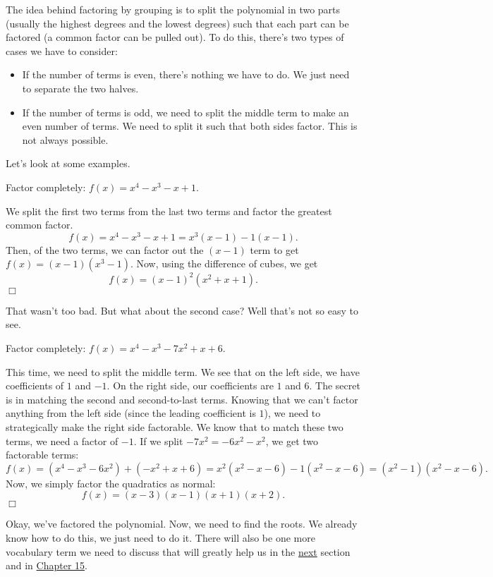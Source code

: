 \documentclass[../book.tex]{subfiles}
\begin{document}
The idea behind factoring by grouping is to split the polynomial in two parts (usually the highest degrees and the lowest degrees) such that each part can be factored (a common factor can be pulled out).  To do this, there's two types of cases we have to consider: \begin{itemize}
    \item If the number of terms is even, there's nothing we have to do.  We just need to separate the two halves.
    \item If the number of terms is odd, we need to split the middle term to make an even number of terms.  We need to split it such that both sides factor.  This is not always possible.
\end{itemize}
Let's look at some examples.
\begin{example}
Factor completely: $f(x)=x^4-x^3-x+1.$
\end{example}
\begin{solution}
We split the first two terms from the last two terms and factor the greatest common factor. $$f(x)=x^4-x^3-x+1=x^3(x-1)-1(x-1).$$ Then, of the two terms, we can factor out the $(x-1)$ term to get $f(x)=(x-1)(x^3-1).$ Now, using the difference of cubes, we get $$f(x)=(x-1)^2(x^2+x+1).$$ $\Box$
\end{solution}
That wasn't too bad.  But what about the second case? Well that's not so easy to see.
\begin{example}
Factor completely: $f(x)=x^4-x^3-7x^2+x+6$.
\end{example}
\begin{solution}
This time, we need to split the middle term.  We see that on the left side, we have coefficients of $1$ and $-1$.  On the right side, our coefficients are $1$ and $6$.  The secret is in matching the second and second-to-last terms.  Knowing that we can't factor anything from the left side (since the leading coefficient is $1$), we need to strategically make the right side factorable. We know that to match these two terms, we need a factor of $-1$.  If we split $-7x^2=-6x^2-x^2$, we get two factorable terms: $$f(x)=(x^4-x^3-6x^2)+(-x^2+x+6)=x^2(x^2-x-6)-1(x^2-x-6)=(x^2-1)(x^2-x-6).$$ Now, we simply factor the quadratics as normal: $$f(x)=(x-3)(x-1)(x+1)(x+2).$$ $\Box$
\end{solution}
Okay, we've factored the polynomial.  Now, we need to find the roots.  We already know how to do this, we just need to do it. There will also be one more vocabulary term we need to discuss that will greatly help us in the \hyperlink{section.6.5}{next} section and in \hyperlink{chapter.15}{Chapter 15}.
\end{document}
